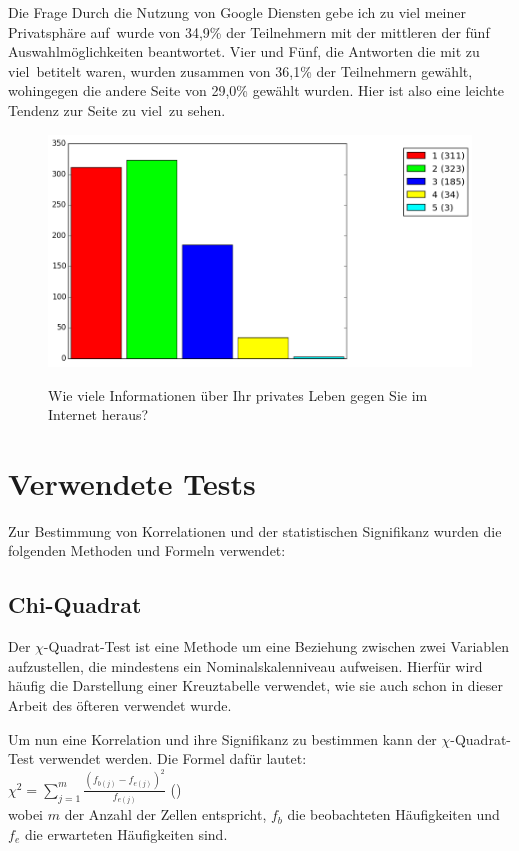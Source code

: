Die Frage \glqq Durch die Nutzung von Google Diensten gebe ich zu viel meiner Privatsphäre auf\grqq\ wurde von 34,9\% der Teilnehmern mit der mittleren der fünf Auswahlmöglichkeiten beantwortet. Vier und Fünf, die Antworten die mit \glqq zu viel\grqq\ betitelt waren, wurden zusammen von 36,1\% der Teilnehmern gewählt, wohingegen die andere Seite von 29,0\% gewählt wurden. Hier ist also eine leichte Tendenz zur Seite \glqq zu viel\grqq\ zu sehen.

\begin{figure}[H]
\centering
\includegraphics[scale=0.55]{images/giveinfo}\\
\caption{Wie viele Informationen über Ihr privates Leben gegen Sie im Internet heraus?}\label{giveinfo}
\end{figure}

\section{Verwendete Tests}
\label{sec:tests}
Zur Bestimmung von Korrelationen und der statistischen Signifikanz wurden die folgenden Methoden und Formeln verwendet:

\subsection{Chi-Quadrat}
\label{chisquared}
Der $\chi$-Quadrat-Test ist eine Methode um eine Beziehung zwischen zwei Variablen aufzustellen, die mindestens ein Nominalskalenniveau aufweisen.
Hierfür wird häufig die Darstellung einer Kreuztabelle verwendet, wie sie auch schon in dieser Arbeit des öfteren verwendet wurde.

Um nun eine Korrelation und ihre Signifikanz zu bestimmen kann der $\chi$-Quadrat-Test verwendet werden. Die Formel dafür lautet:\\
$\chi^2 = \sum_{j=1}^m \frac{(f_{b(j)} - f_{e(j)})^2}{f_{e(j)}}$ (\citet{statistikeinfuehrung})\\
wobei $m$ der Anzahl der Zellen entspricht, $f_b$ die beobachteten Häufigkeiten und $f_e$ die erwarteten Häufigkeiten sind.

